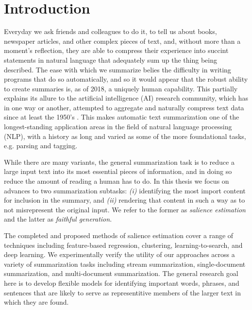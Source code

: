 \section{Introduction}

Everyday we ask friends and colleagues to do it, to tell us about books, 
newspaper articles, and other complex pieces of text, and, without more than a 
moment's reflection, they are able to compress their experience
into succint statements in natural language that adequately sum up the thing
being described. The ease with which we summarize belies the difficulty in 
writing programs that do so automatically, and so it would appear that 
the robust
ability to create summaries is, as of 2018, a uniquely human capability.
This partially explains its allure to the artificial intelligence (AI)
research community, which has in one way or another, attempted to aggregate
and naturally compress text data since at least the 1950's 
\citep{luhn1958automatic}.
This makes automatic text summarization one of the longest-standing 
application areas in the 
field of natural language processing (NLP), with a history as long and varied
as some of the more foundational tasks, e.g. parsing and tagging. 

While there are many variants, 
the general summarization task is 
to reduce a large input text into its most essential pieces of information,
and in doing so reduce the amount of reading a human has to do. 
In this thesis we focus on advances to two summarization subtasks:
\textit{(i)} identifying the most import content for inclusion in the summary, 
and \textit{(ii)}
rendering that content in such a way as to not misrepresent the original 
input. We refer to the former as \emph{salience estimation} and the latter
as \emph{faithful generation}. 

The completed and proposed methods of salience estimation cover a range of
techniques including feature-based regression, clustering, learning-to-search,
and deep learning. We experimentally verify the utility of our approaches
across a variety of summarization tasks including stream summarization,
single-document summarization, and multi-document summarization.
The general research goal here is to develop flexible models for 
identifying
important words, phrases, and sentences that are likely to serve as 
representitive members of the larger text in which they are found.

